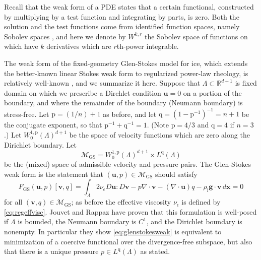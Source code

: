 \documentclass[letterpaper,final,12pt,reqno]{amsart}
\theoremstyle{claim}
\newcommand{\eps}{\epsilon}
\newcommand{\RR}{\mathbb{R}}
\newcommand{\Div}{\nabla\cdot}
\newcommand{\bg}{\mathbf{g}}
\newcommand{\bu}{\mathbf{u}}
\newcommand{\bv}{\mathbf{v}}
\newcommand{\bx}{\mathbf{x}}
\newcommand{\rhoi}{\rho_{\text{i}}}
\newcommand{\pp}{{\text{p}}}
\newcommand{\qq}{{\text{q}}}
\numberwithin{equation}{section}
\numberwithin{figure}{section}
\numberwithin{table}{section}
\numberwithin{theorem}{section}
\begin{document}
Recall that the weak form of a PDE states that a certain functional, constructed by multiplying by a test function and integrating by parts, is zero.  Both the solution and the test functions come from identified function spaces, namely Sobolev spaces \cite{Evans2010}, and here we denote by $W^{k,r}$ the Sobolev space of functions on which have $k$ derivatives which are $r$th-power integrable.

The weak form of the fixed-geometry Glen-Stokes model for ice, which extends the better-known linear Stokes weak form \cite{Elmanetal2014} to regularized power-law rheology, is relatively well-known \cite{IsaacStadlerGhattas2015,JouvetRappaz2011,Lengetal2012}, and we summarize it here.  Suppose that $\Lambda \subset \RR^{d+1}$ is fixed domain on which we prescribe a Dirchlet condition $\bu=0$ on a portion of the boundary, and where the remainder of the boundary (Neumann boundary) is stress-free.  Let $\pp=(1/n)+1$ as before, and let $\qq=(1-\pp^{-1})^{-1}=n+1$ be the conjugate exponent, so that $\pp^{-1}+\qq^{-1}=1$. (Note $\pp=4/3$ and $\qq = 4$ if $n=3$.)  Let $W_0^{1,\pp}(\Lambda)^{d+1}$ be the space of velocity functions which are zero along the Dirichlet boundary.  Let
\begin{equation}
\mathcal{M}_{\text{GS}} = W_0^{1,\pp}(\Lambda)^{d+1} \times L^\qq(\Lambda)  \label{eq:mixed}
\end{equation}
be the (mixed) space of admissible velocity and pressure pairs.  The Glen-Stokes weak form is the statement that $(\bu,p) \in \mathcal{M}_{\text{GS}}$ should satisfy
\begin{equation}
F_{\text{GS}}(\bu,p)[\bv,q] = \int_\Lambda 2 \nu_\eps D\bu : D\bv - p \Div\bv - (\Div\bu) q - \rhoi \bg \cdot \bv\,d\bx = 0 \label{eq:glenstokesweak}
\end{equation}
for all $(\bv,q) \in \mathcal{M}_{\text{GS}}$; as before the effective viscosity $\nu_\eps$ is defined by \eqref{eq:regeffvisc}.  Jouvet and Rappaz \cite{JouvetRappaz2011} have proven that this formulation is well-posed if $\Lambda$ is bounded, the Neumann boundary is $C^1$, and the Dirichlet boundary is nonempty.  In particular they show \eqref{eq:glenstokesweak} is equivalent to minimization of a coercive functional over the divergence-free subspace, but also that there is a unique pressure $p\in L^\qq(\Lambda)$ as stated.
\end{document}

